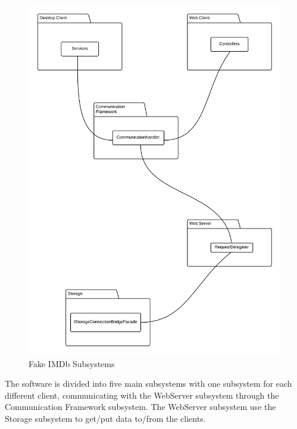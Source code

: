 \begin{figure}[H]
\includegraphics[scale=0.17]{img/SDD/FakeIMDbSubsytems.png}
\caption{Fake IMDb Subsystems}
\label{fig:FakeIMDBSubsystems}
\end{figure}

The software is divided into five main subsystems with one subsystem for each different client, communicating with the WebServer subsystem through the Communication Framework subsystem. The WebServer subsystem use the Storage subsystem to get/put data to/from the clients.\\


